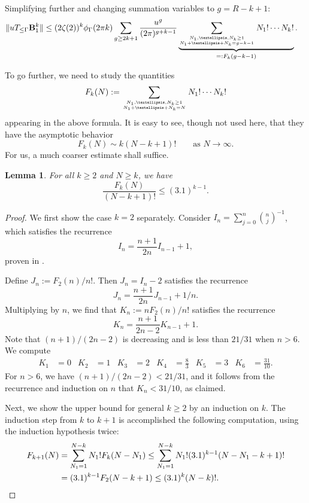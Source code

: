 \documentclass[12pt]{amsart}
\newtheorem{lem}[thm]{Lemma}
\theoremstyle{definition}
\numberwithin{equation}{section}
\newcommand{\bB}{\mathbf{B}}
\theoremstyle{definition} %
\theoremstyle{remark}
\begin{document}
Simplifying further and changing summation variables to $g=R-k+1$:
\begin{align}\label{equ:pre Delta}
  \|u T_{\leq \Gamma} \bB_1^k\| &\leq
  (2\zeta(2))^k 
  \phi_\Gamma(2\pi k)
  \sum_{g\geq 2k+1}
  \frac{u^g}{(2\pi)^{g+k-1}}
  \underbrace{\sum_{N_1,\dots,N_k\geq 1\atop N_1+\dots+N_k=g-k-1}
  N_1!\cdots N_k!}_{=:F_k(g-k-1)}.
\end{align}

To go further, we need to study the quantities 
\[
    F_k(N):=\sum_{N_1,\dots,N_k\geq 1\atop N_1+\dots+N_k=N}
    N_1!\cdots N_k!
\]
appearing in the above formula. It is easy to see, though not used here, that they have the asymptotic behavior 
\[
    F_k(N)
    \sim k (N-k+1)! \quad\quad \text{as $N\to \infty$.}
\]
For us, a much coarser estimate shall suffice.
\begin{lem}\label{lem:Fk}
For all $k\geq 2$ and $N\geq k$, we have 
\[
        \frac{F_k(N)}{(N-k+1)!} \leq (3.1)^{k-1}.
\]
\end{lem}
\begin{proof}

We first show the case $k=2$ separately.
Consider $I_n = \sum_{ j =0}^n \binom{n}{j}^{-1}$, which satisfies the recurrence
   \[
   I_n = \frac{n+1}{2n} I_{n-1} + 1,
   \] 
proven in \cite{Rockett}.

Define $J_n := F_2(n) / n!$. Then $J_n = I_n - 2$ satisfies the recurrence
\[
J_n = \frac{n+1}{2n} J_{n-1} + 1/n.
\]
Multiplying by $n$, we find that $K_n := n F_2(n) / n!$ satisfies the recurrence
\[
K_n = \frac{n+1}{2n-2} K_{n-1} + 1.
\]
Note that $(n+1) / (2n-2)$ is decreasing and is less than $21/31$ when $n > 6$.  We compute
\begin{align*}
K_1 &= 0
&
K_2 &= 1
&
K_3 &= 2
&
K_4 &= \frac83
&
K_5 &= 3&
K_6 &= \frac{31}{10}.
\end{align*}
For $n > 6$, we have $(n+1)/(2n-2) < 21/31$, and it follows from the recurrence and induction on $n$ that $K_n < 31/10$, as claimed.

Next, we show the upper bound for general $k\geq 2$ by an induction on $k$.
The induction step from $k$ to $k+1$ is accomplished the following computation, using the induction hypothesis twice:
\begin{align*}
F_{k+1}(N)
&=\sum_{N_1=1}^{N-k}
N_1! F_{k}(N-N_1) \leq \sum_{N_1=1}^{N-k} N_1!(3.1)^{k-1} (N-N_1-k+1)!
\\&= (3.1)^{k-1}  F_2(N-k+1) \leq  (3.1)^{k} (N-k)!. \qedhere
\end{align*}
\end{proof}
\end{document}
